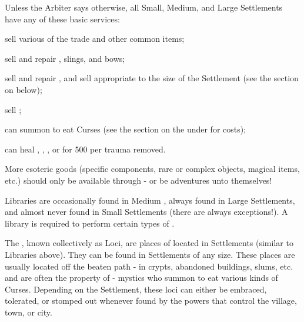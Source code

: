 

  Unless the Arbiter says otherwise, all Small, Medium, and Large Settlements have any of these basic services:

   sell various  of the trade and other common items;

   sell and repair , slings, and bows;

   sell and repair , and sell  appropriate to the size of the Settlement (see the section on  below);

   sell ; 


   can summon  to eat Curses (see the section on the  under  for costs);


    can heal , , , or  for 500 \AG per trauma removed.


More esoteric goods (specific components, rare or complex objects, magical items, etc.) should only be available through  - or be adventures unto themselves!


Libraries are occasionally found in Medium , always found in Large Settlements, and almost never found in Small Settlements (there are always exceptions!). A library is required to perform certain types of .


The , known collectively as Loci, are places of  located in Settlements (similar to Libraries above).  They can be found in Settlements of any size.  These places are usually located off the beaten path - in crypts, abandoned buildings, slums, etc. and are often the property of  - mystics who summon  to eat various kinds of Curses. Depending on the Settlement, these loci can either be embraced, tolerated, or stomped out whenever found by the powers that control the village, town, or city. 


